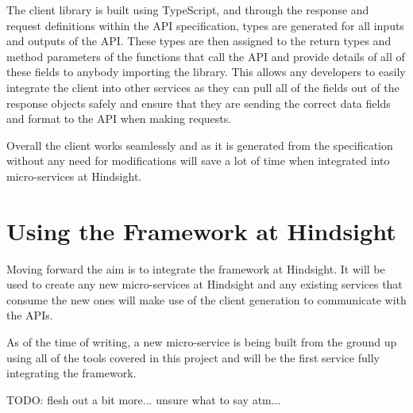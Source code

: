 The client library is built using TypeScript, and through the response and request definitions within the API specification, types are generated for all inputs and outputs of the API. These types are then assigned to the return types and method parameters of the functions that call the API and provide details of all of these fields to anybody importing the library. This allows any developers to easily integrate the client into other services as they can pull all of the fields out of the response objects safely and ensure that they are sending the correct data fields and format to the API when making requests.

Overall the client works seamlessly and as it is generated from the specification without any need for modifications will save a lot of time when integrated into micro-services at Hindsight.
\section{Using the Framework at Hindsight}
Moving forward the aim is to integrate the framework at Hindsight. It will be used to create any new micro-services at Hindsight and any existing services that consume the new ones will make use of the client generation to communicate with the APIs.

As of the time of writing, a new micro-service is being built from the ground up using all of the tools covered in this project and will be the first service fully integrating the framework.

TODO: flesh out a bit more... unsure what to say atm...
